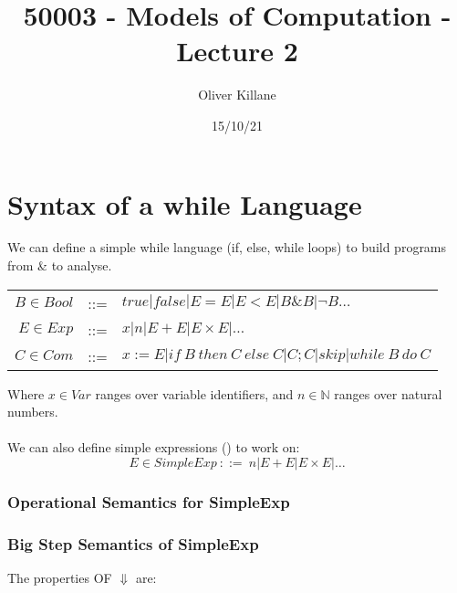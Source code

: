 \documentclass{report}
\title{50003 - Models of Computation - Lecture 2}
\author{Oliver Killane}
\date{15/10/21}
\begin{document}
    \maketitle

    \section*{Syntax of a while Language}
        We can define a simple while language (if, else, while loops) to build programs from \& to analyse.
        \begin{center}
            \begin{tabular}{r c l}
                $B \in Bool$ & ::= & $true | false | E = E | E < E | B \& B | \neg B \dots$ \\
                $E \in Exp$ & ::= & $x | n | E + E | E \times E | \dots$ \\
                $C \in Com$ & ::= & $x :=E | if \ B \ then \ C \ else \ C | C;C | skip | while \ B \ do \ C$ \\
            \end{tabular}
        \end{center}
        Where $x \in Var$ ranges over variable identifiers, and $n \in \mathbb{N}$ ranges over natural numbers.
        \\
        \\ We can also define simple expressions () to work on:
        \[E \in SimpleExp \ ::= \ n | E + E | E \times E | \dots\]
        \subsubsection*{Operational Semantics for SimpleExp}
            \begin{itemize}
            \end{itemize}
        \subsubsection*{Big Step Semantics of SimpleExp}
            The properties OF $\Downarrow$ are:
            \begin{itemize}
            \end{itemize}
\end{document}
